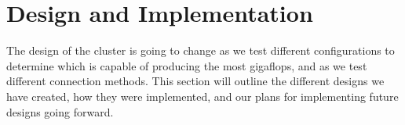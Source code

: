 

\chapter{Design  and Implementation}

The design of the cluster is going to change as we test different configurations to determine which is capable of producing the most gigaflops, and as we test different connection methods. This section will outline the different designs we have created, how they were implemented, and our plans for implementing future designs going forward.

